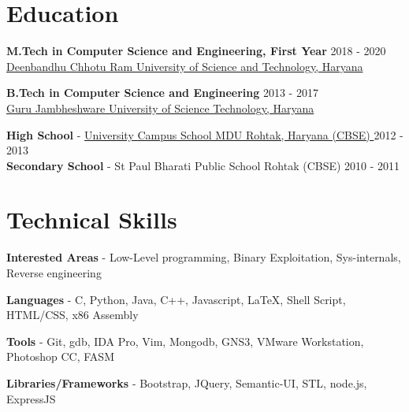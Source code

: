 \documentclass[margin, centered]{res}
\begin{document}
\begin{resume}

\section{Education}

\textbf{M.Tech in Computer Science and Engineering, First Year} \hfill 2018 - 2020 \\
\href{http://dcrustm.ac.in//}{Deenbandhu Chhotu Ram University of Science and Technology, Haryana}

\textbf{B.Tech in Computer Science and Engineering} \hfill 2013 - 2017 \\
\href{http://www.gjust.ac.in/}{Guru Jambheshware University of Science Technology, Haryana}

\textbf{High School} - \href{http://www.mdurohtak.ac.in/info/campusschool.html/} {University Campus School MDU Rohtak, Haryana (CBSE) } \hfill 2012 - 2013 \\
\textbf{Secondary School} - St Paul Bharati Public School Rohtak (CBSE)  \hfill 2010 - 2011 \\
\vspace{3mm}
\section{Technical \hspace{2mm} Skills}
\textbf{Interested Areas} - Low-Level programming, Binary Exploitation, Sys-internals, Reverse engineering 

\textbf{Languages} - C, Python, Java, C++, Javascript, \LaTeX, Shell Script, HTML/CSS, x86 Assembly

\textbf{Tools} - Git, gdb, IDA Pro, Vim, Mongodb, GNS3, VMware Workstation, Photoshop CC, FASM

\textbf{Libraries/Frameworks} - Bootstrap, JQuery, Semantic-UI, STL, node.js, ExpressJS
\vspace{4mm}



\end{resume}
\end{document}
